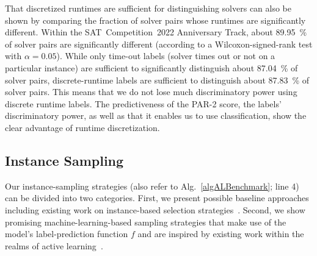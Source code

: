 \documentclass[runningheads]{llncs}
\begin{document}
That discretized runtimes are sufficient for distinguishing solvers can also be shown by comparing the fraction of solver pairs whose runtimes are significantly different.
Within the SAT~Competition~2022 Anniversary Track, about \SI{89.95}{\%} of solver pairs are significantly different (according to a Wilcoxon-signed-rank test with $\alpha = 0.05$).
While only time-out labels (solver times out or not on a particular instance) are sufficient to significantly distinguish about \SI{87.04}{\%} of solver pairs, discrete-runtime labels are sufficient to distinguish about \SI{87.83}{\%} of solver pairs.
This means that we do not lose much discriminatory power using discrete runtime labels.
The predictiveness of the PAR-2 score, the labels' discriminatory power, as well as that it enables us to use classification, show the clear advantage of runtime discretization.


\subsection{Instance Sampling}
\label{sec:main2}
Our instance-sampling strategies (also refer to Alg.~\ref{algALBenchmark}; line 4) can be divided into two categories.
First, we present possible baseline approaches including existing work on instance-based selection strategies~\cite{Bossek021a,GentHJKMNN14,MatriconAFSH21}.
Second, we show promising machine-learning-based sampling strategies that make use of the model's label-prediction function $f$ and are inspired by existing work within the realms of active learning~\cite{settles2009active}.
\end{document}
